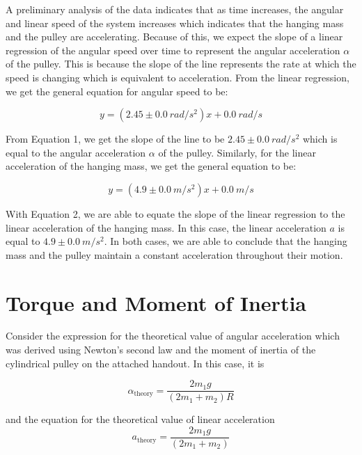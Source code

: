 \documentclass[12pt]{article}
\begin{document}
A preliminary analysis of the data indicates that as time increases, the angular and linear speed of the system increases which indicates that the hanging mass and the pulley are accelerating. Because of this, we expect the slope of a linear regression of the angular speed over time to represent the angular acceleration $\alpha$ of the pulley. This is because the slope of the line represents the rate at which the speed is changing which is equivalent to acceleration. From the linear regression, we get the general equation for angular speed to be:

\begin{equation} \label{eq1}
    y=(2.45 \pm \SI{0.0}{rad/s^2})x + \SI{0.0}{rad/s}
\end{equation}


From Equation 1, we get the slope of the line to be $2.45 \pm \SI{0.0}{rad/s^2}$ which is equal to the angular acceleration $\alpha$ of the pulley. Similarly, for the linear acceleration of the hanging mass, we get the general equation to be:

\begin{equation} \label{eq2}
    y=(4.9 \pm \SI{0.0}{m/s^2})x + \SI{0.0}{m/s}
\end{equation}

With Equation 2, we are able to equate the slope of the linear regression to the linear acceleration of the hanging mass. In this case, the linear acceleration $a$ is equal to $4.9 \pm \SI{0.0}{m/s^2}$. In both cases, we are able to conclude that the hanging mass and the pulley maintain a constant acceleration throughout their motion.

\section{Torque and Moment of Inertia}
Consider the expression for the theoretical value of angular acceleration which was derived using Newton's second law and the moment of inertia of the cylindrical pulley on the attached handout. In this case, it is

\begin{equation} \label{eq3}
    \alpha_\text{theory}=\frac{2m_1g}{(2m_1 + m_2)R}
\end{equation}

and the equation for the theoretical value of linear acceleration
\begin{equation} \label{eq4}
    a_\text{theory}=\frac{2m_1g}{(2m_1 + m_2)}
\end{equation}
\end{document}
